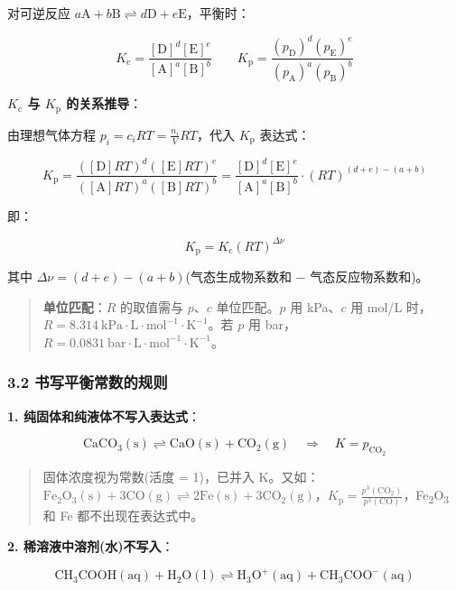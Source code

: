 对可逆反应 \(a\mathrm{A} + b\mathrm{B} \rightleftharpoons d\mathrm{D} + e\mathrm{E}\)，平衡时：

\[
K_{\mathrm c} = \frac{[\mathrm{D}]^d[\mathrm{E}]^e}{[\mathrm{A}]^a[\mathrm{B}]^b} \qquad K_{\mathrm p} = \frac{(p_\mathrm{D})^d(p_\mathrm{E})^e}{(p_\mathrm{A})^a(p_\mathrm{B})^b}
\]

\textbf{\(K_{\mathrm c}\) 与 \(K_{\mathrm p}\) 的关系推导}：

由理想气体方程 \(p_i = c_i RT = \frac{n_i}{V}RT\)，代入 \(K_{\mathrm p}\) 表达式：

\[
K_{\mathrm p} = \frac{([\mathrm{D}]RT)^d([\mathrm{E}]RT)^e}{([\mathrm{A}]RT)^a([\mathrm{B}]RT)^b} = \frac{[\mathrm{D}]^d[\mathrm{E}]^e}{[\mathrm{A}]^a[\mathrm{B}]^b} \cdot (RT)^{(d+e)-(a+b)}
\]

即：

\[
\boxed{K_{\mathrm p} = K_{\mathrm c}(RT)^{\Delta\nu}}
\]

其中 \(\Delta\nu = (d+e) - (a+b)\)(气态生成物系数和 − 气态反应物系数和)。

\begin{quote}
\textbf{单位匹配}：\(R\) 的取值需与 \(p\)、\(c\) 单位匹配。\(p\) 用 kPa、\(c\) 用 mol/L 时，\(R = 8.314\ \mathrm{kPa \cdot L \cdot mol^{-1} \cdot K^{-1}}\)。若 \(p\) 用 bar，\(R = 0.0831\ \mathrm{bar \cdot L \cdot mol^{-1} \cdot K^{-1}}\)。
\end{quote}

\subsubsection{3.2 书写平衡常数的规则}\label{ux4e66ux5199ux5e73ux8861ux5e38ux6570ux7684ux89c4ux5219}

\textbf{1. 纯固体和纯液体不写入表达式}：

\[
\mathrm{CaCO_3(s) \rightleftharpoons CaO(s) + CO_2(g)} \quad \Rightarrow \quad K = p_{\mathrm{CO_2}}
\]

\begin{quote}
固体浓度视为常数(活度 = 1)，已并入 K。又如：\(\mathrm{Fe_2O_3(s) + 3CO(g) \rightleftharpoons 2Fe(s) + 3CO_2(g)}\)，\(K_{\mathrm p} = \frac{p^3(\mathrm{CO_2})}{p^3(\mathrm{CO})}\)，Fe\textsubscript{2}O\textsubscript{3} 和 Fe 都不出现在表达式中。
\end{quote}

\textbf{2. 稀溶液中溶剂(水)不写入}：

\[
\mathrm{CH_3COOH(aq) + H_2O(l) \rightleftharpoons H_3O^+(aq) + CH_3COO^-(aq)}
\]

